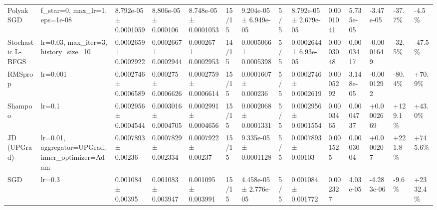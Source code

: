 \begin{tabular}{llllllllllllll}
Polyak SGD & f\_star=0, max\_lr=1, eps=1e-08 & 8.792e-05 ± 0.0001059 & 8.806e-05 ± 0.000106 & 8.748e-05 ± 0.0001053 & 15/15 & 9.204e-05 ± 6.949e-05 & 5/5 & 8.792e-05 ± 2.679e-05 & 0.0001041 & 5.735e-05 & -3.47e-05 & -37.7\% & -4.5\% \\
Stochastic L-BFGS & lr=0.03, max\_iter=3, history\_size=10 & 0.0002659 ± 0.0002922 & 0.0002667 ± 0.0002944 & 0.000267 ± 0.0002953 & 14/15 & 0.0005066 ± 0.0005398 & 5/5 & 0.0002644 ± 6.93e-05 & 0.0003048 & 0.0003417 & -0.0001649 & -32.5\% & -47.5\% \\
RMSprop & lr=0.001 & 0.0002746 ± 0.0006589 & 0.000275 ± 0.0006626 & 0.0002759 ± 0.0006614 & 15/15 & 0.0001607 ± 0.000236 & 5/5 & 0.0002746 ± 0.0002619 & 0.0005292 & 3.148e-05 & -0.0001292 & -80.4\% & +70.9\% \\
Shampoo & lr=0.1 & 0.0002956 ± 0.0004544 & 0.0003016 ± 0.0004705 & 0.0002991 ± 0.0004656 & 15/15 & 0.0002068 ± 0.0001331 & 5/5 & 0.0002956 ± 0.0001554 & 0.0003465 & 0.0004737 & +0.0002669 & +129.1\% & +43.0\% \\
JD (UPGrad) & lr=0.01, aggregator=UPGrad, inner\_optimizer=Adam & 0.0007893 ± 0.00236 & 0.0007829 ± 0.002334 & 0.0007922 ± 0.00237 & 15/15 & 9.335e-05 ± 0.0001128 & 5/5 & 0.0007893 ± 0.00103 & 0.001525 & 0.0003004 & +0.000207 & +221.8\% & +745.6\% \\
SGD & lr=0.3 & 0.001084 ± 0.00395 & 0.001083 ± 0.003947 & 0.001095 ± 0.003991 & 15/15 & 4.458e-05 ± 2.776e-05 & 5/5 & 0.001084 ± 0.001772 & 0.002327 & 4.03e-05 & -4.283e-06 & -9.6\% & +2332.4\% \\
\bottomrule
\end{tabular}
